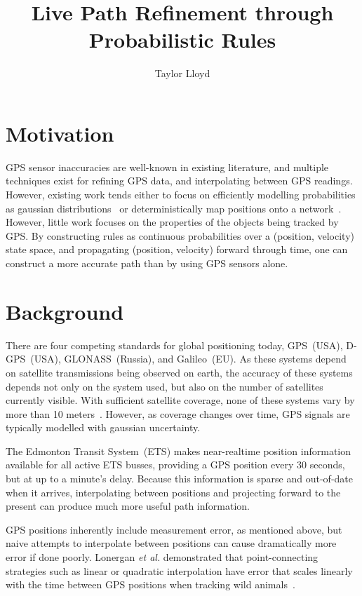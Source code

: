 \documentclass{article}
\begin{document}
\title{Live Path Refinement through Probabilistic Rules}
\author{Taylor Lloyd}

\maketitle

\section{Motivation}
    GPS sensor inaccuracies are well-known in existing literature, and multiple techniques exist for refining GPS data, and interpolating between GPS readings.
    However, existing work tends either to focus on efficiently modelling probabilities as gaussian distributions~\cite{kobayashiITIE98} or deterministically map positions onto a network~\cite{brakatsoulasVLDB05}.
    However, little work focuses on the properties of the objects being tracked by GPS. By constructing rules as continuous probabilities over a (position, velocity) state space, and propagating (position, velocity) forward through time, one can construct a more accurate path than by using GPS sensors alone.

\section{Background}

    There are four competing standards for global positioning today, GPS~(USA), D-GPS~(USA), GLONASS~(Russia), and Galileo~(EU). As these systems depend on satellite transmissions being observed on earth, the accuracy of these systems depends not only on the system used, but also on the number of satellites currently visible. With sufficient satellite coverage, none of these systems vary by more than 10 meters~\cite{liJG15}. However, as coverage changes over time, GPS signals are typically modelled with gaussian uncertainty.

    The Edmonton Transit System~(ETS) makes near-realtime position information available for all active ETS busses, providing a GPS position every 30 seconds, but at up to a minute's delay.
    Because this information is sparse and out-of-date when it arrives, interpolating between positions and projecting forward to the present can produce much more useful path information.

  GPS positions inherently include measurement error, as mentioned above, but naive attempts to interpolate between positions can cause dramatically more error if done poorly. Lonergan \textit{et al.} demonstrated that point-connecting strategies such as linear or quadratic interpolation have error that scales linearly with the time between GPS positions when tracking wild animals~\cite{lonergan09}.
\end{document}
